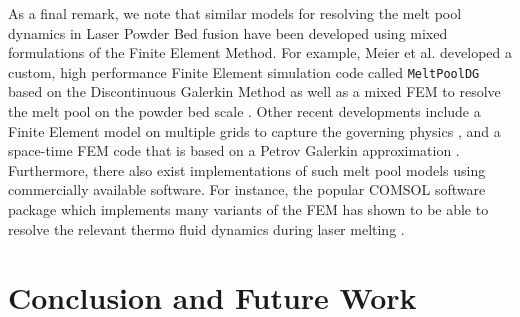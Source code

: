 \documentclass[sn-mathphys,Numbered]{sn-jnl}%
\theoremstyle{thmstyleone}%
\theoremstyle{thmstyletwo}%
\theoremstyle{thmstylethree}%
\begin{document}
As a final remark, we note that similar models for resolving the melt pool dynamics in Laser Powder Bed fusion have been developed using mixed formulations of the Finite Element Method.
For example, Meier et al. developed a custom, high performance Finite Element simulation code called \texttt{MeltPoolDG} based on the Discontinuous Galerkin Method as well as a mixed FEM to resolve the melt pool on the powder bed scale \cite{meier2021physics,kronbichler2018fast}.
Other recent developments include a Finite Element model on multiple grids to capture the governing physics \cite{caboussatNumericalSimulationTemperaturedriven2023}, and a space-time FEM code that is based on a Petrov Galerkin approximation \cite{koppSpacetimeHpfiniteElements2022}.
Furthermore, there also exist implementations of such melt pool models using commercially available software.
For instance, the popular COMSOL software package which implements many variants of the FEM has shown to be able to resolve the relevant thermo fluid dynamics during laser melting \cite{liuSimulationPowderPacking2020,mayiTransientDynamicsStability2021}.

\section{Conclusion and Future Work}
\end{document}
